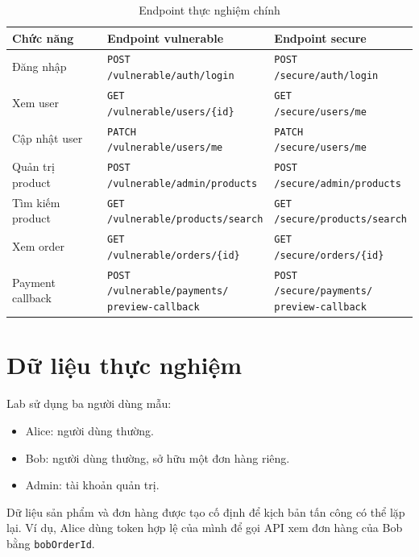 \documentclass[14pt,a4paper]{extreport}
\newcommand{\endpoint}[2]{\parbox[t]{5.2cm}{\footnotesize\texttt{#1}\\\footnotesize\texttt{#2}}}
\newcommand{\endpointthree}[3]{\parbox[t]{5.2cm}{\footnotesize\texttt{#1}\\\footnotesize\texttt{#2}\\\footnotesize\texttt{#3}}}
\begin{document}
\begin{longtable}{>{\raggedright\arraybackslash}p{3.2cm}
                  >{\raggedright\arraybackslash}p{5.6cm}
                  >{\raggedright\arraybackslash}p{5.6cm}}
\caption{Endpoint thực nghiệm chính}\\
\toprule
\textbf{Chức năng} & \textbf{Endpoint vulnerable} & \textbf{Endpoint secure}\\
\midrule
Đăng nhập & {\footnotesize \endpoint{POST}{/vulnerable/auth/login}} & {\footnotesize \endpoint{POST}{/secure/auth/login}}\\
Xem user & {\footnotesize \endpoint{GET}{/vulnerable/users/\{id\}}} & {\footnotesize \endpoint{GET}{/secure/users/me}}\\
Cập nhật user & {\footnotesize \endpoint{PATCH}{/vulnerable/users/me}} & {\footnotesize \endpoint{PATCH}{/secure/users/me}}\\
Quản trị product & {\footnotesize \endpoint{POST}{/vulnerable/admin/products}} & {\footnotesize \endpoint{POST}{/secure/admin/products}}\\
Tìm kiếm product & {\footnotesize \endpoint{GET}{/vulnerable/products/search}} & {\footnotesize \endpoint{GET}{/secure/products/search}}\\
Xem order & {\footnotesize \endpoint{GET}{/vulnerable/orders/\{id\}}} & {\footnotesize \endpoint{GET}{/secure/orders/\{id\}}}\\
Payment callback & {\footnotesize \endpointthree{POST}{/vulnerable/payments/}{preview-callback}} & {\footnotesize \endpointthree{POST}{/secure/payments/}{preview-callback}}\\
\bottomrule
\end{longtable}

\section{Dữ liệu thực nghiệm}
Lab sử dụng ba người dùng mẫu:
\begin{itemize}
  \item Alice: người dùng thường.
  \item Bob: người dùng thường, sở hữu một đơn hàng riêng.
  \item Admin: tài khoản quản trị.
\end{itemize}

Dữ liệu sản phẩm và đơn hàng được tạo cố định để kịch bản tấn công có thể lặp lại. Ví dụ, Alice dùng token hợp lệ của mình để gọi API xem đơn hàng của Bob bằng \texttt{bobOrderId}.
\end{document}
